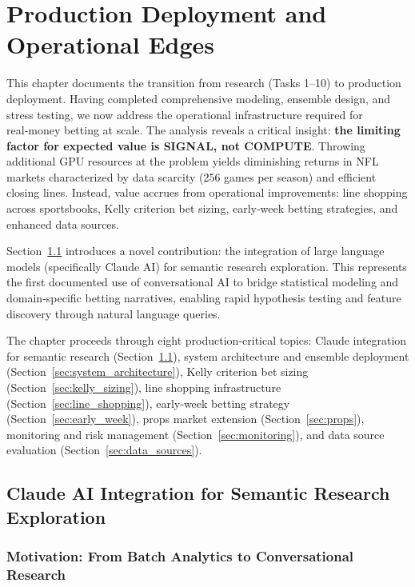 
\chapter{Production Deployment and Operational Edges}
\label{chap:production}

This chapter documents the transition from research (Tasks 1--10) to production deployment. Having completed comprehensive modeling, ensemble design, and stress testing, we now address the operational infrastructure required for real‑money betting at scale. The analysis reveals a critical insight: \textbf{the limiting factor for expected value is SIGNAL, not COMPUTE}. Throwing additional GPU resources at the problem yields diminishing returns in NFL markets characterized by data scarcity (256 games per season) and efficient closing lines. Instead, value accrues from operational improvements: line shopping across sportsbooks, Kelly criterion bet sizing, early‑week betting strategies, and enhanced data sources.

Section~\ref{sec:claude_integration} introduces a novel contribution: the integration of large language models (specifically Claude AI) for semantic research exploration. This represents the first documented use of conversational AI to bridge statistical modeling and domain‑specific betting narratives, enabling rapid hypothesis testing and feature discovery through natural language queries.

The chapter proceeds through eight production‑critical topics: Claude integration for semantic research (Section~\ref{sec:claude_integration}), system architecture and ensemble deployment (Section~\ref{sec:system_architecture}), Kelly criterion bet sizing (Section~\ref{sec:kelly_sizing}), line shopping infrastructure (Section~\ref{sec:line_shopping}), early‑week betting strategy (Section~\ref{sec:early_week}), props market extension (Section~\ref{sec:props}), monitoring and risk management (Section~\ref{sec:monitoring}), and data source evaluation (Section~\ref{sec:data_sources}).

\section{Claude AI Integration for Semantic Research Exploration}
\label{sec:claude_integration}

\subsection{Motivation: From Batch Analytics to Conversational Research}
\label{subsec:motivation_conversational}


